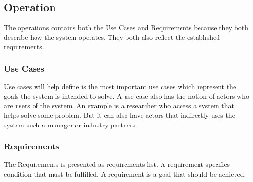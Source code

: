 \subsection{Operation}\label{sc:operation}
The operations contains both the Use Cases and Requirements because they both describe how the system operates. They both also reflect the established requirements.

\subsubsection{Use Cases}\label{ssc:usecases}
Use cases will help define is the most important use cases which represent the goals the system is intended to solve. A use case also has the notion of actors who are users of the system. An example is a researcher who access a system that helps solve some problem. But it can also have actors that indirectly uses the system such a manager or industry partners.

\subsubsection{Requirements}\label{ssc:requirements}
The Requirements is presented as requirements list. A requirement specifies condition that must be fulfilled. A requirement is a goal that should be achieved. 
